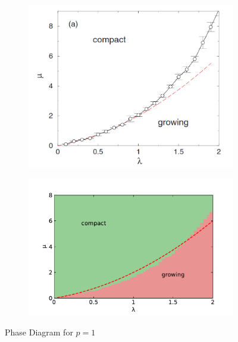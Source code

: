 \documentclass[11pt]{article}
\begin{document}
\begin{figure}[!h]
	\centering
	\begin{subfigure}{\linewidth}
		\centering
		\includegraphics[width=14cm]{plots/6a.png}
	\end{subfigure}
	\begin{subfigure}{\linewidth}
		\centering
		\includegraphics[width=15cm]{plots/6a.pdf}
	\end{subfigure}
	\caption{Phase Diagram for $p=1$}
\end{figure}
\end{document}

